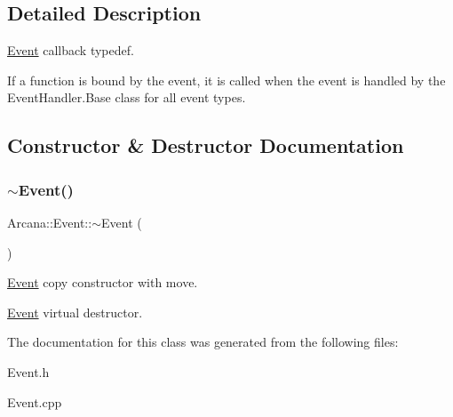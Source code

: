 \subsection{Detailed Description}
\mbox{\hyperlink{class_arcana_1_1_event}{Event}} callback typedef. 

If a function is bound by the event, it is called when the event is handled by the Event\+Handler.\+Base class for all event types. 

\subsection{Constructor \& Destructor Documentation}
\mbox{\label{class_arcana_1_1_event_a5e1da20e67addbcecc0d21032573002e}} 
\subsubsection{\texorpdfstring{$\sim$\+Event()}{~Event()}}
{\footnotesize\ttfamily Arcana\+::\+Event\+::$\sim$\+Event (\begin{DoxyParamCaption}{ }\end{DoxyParamCaption})\hspace{0.3cm}{\ttfamily [virtual]}}



\mbox{\hyperlink{class_arcana_1_1_event}{Event}} copy constructor with move. 

\mbox{\hyperlink{class_arcana_1_1_event}{Event}} virtual destructor. 

The documentation for this class was generated from the following files\+:\begin{DoxyCompactItemize}
\item 
Event.\+h\item 
Event.\+cpp\end{DoxyCompactItemize}
